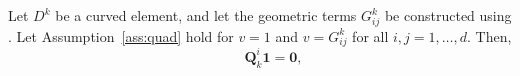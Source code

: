 \documentclass{svjour3}                     %
\newcommand{\diag}[1]{{\rm diag}\LRp{#1}}
\newcommand{\LRp}[1]{\left( #1 \right)}
\newcommand{\rnote}[1]{{\color{red}{#1}}}
\begin{document}
\begin{lemma}
\label{lemma:vdsbpcurved} 
Let $D^k$ be a curved element, and let the geometric terms $G^k_{ij}$ be constructed using \rnote{(\ref{eq:iconscurl})}.  Let Assumption~\ref{ass:quad} hold for $v = 1$ and $v = G^k_{ij}$ for all $i,j = 1,\ldots, d$.  Then,%
\[
\qquad \bm{Q}^i_k\bm{1} = \bm{0},
\]
\end{lemma}
\end{document}
